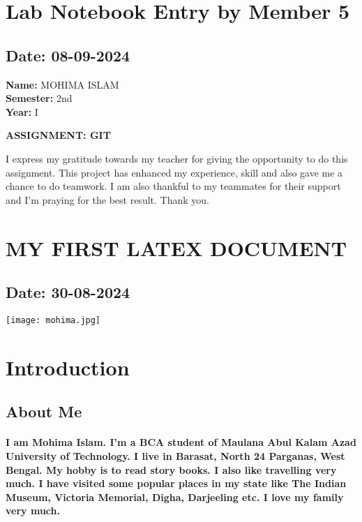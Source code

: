 \documentclass[12pt]{article}
\begin{document}
\section{Lab Notebook Entry by Member 5}
\subsection*{Date: 08-09-2024}

\begin{flushright}
\textbf{Name:} MOHIMA ISLAM \\
\textbf{Semester:} 2nd \\
\textbf{Year:} I \\
\end{flushright}

\begin{center}
\Huge \textbf{ASSIGNMENT: GIT}
\end{center}

I express my gratitude towards my teacher for giving the opportunity to do this assignment. This project has enhanced my experience, skill and also gave me a chance to do teamwork. I am also thankful to my teammates for their support and I'm praying for the best result. Thank you.
\newpage
\section{MY FIRST LATEX DOCUMENT}
\subsection*{Date: 30-08-2024}
 \begin{center}
        \texttt{[image: mohima.jpg]}
     \end{center}
\section{Introduction}
\subsection{About Me}
\paragraph{I am Mohima Islam. I'm a BCA student of Maulana Abul Kalam Azad University of Technology. I live in Barasat, North 24 Parganas, West Bengal. My hobby is to read story books. I also like travelling very much. I have visited some popular places in my state like The Indian Museum, Victoria Memorial, Digha, Darjeeling etc. I love my family very much. }
\end{document}

